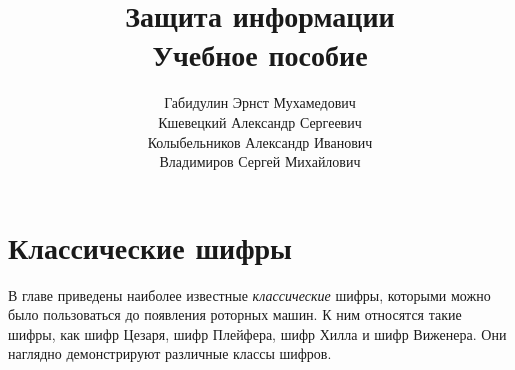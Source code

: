 

\title{Защита информации \\ Учебное пособие}
\author{Габидулин Эрнст Мухамедович \\ Кшевецкий Александр Сергеевич \\ Колыбельников Александр Иванович \\ Владимиров Сергей Михайлович}
\date{
}
\maketitle
\setcounter{page}{3}

\newpage
\setcounter{tocdepth}{2}
\tableofcontents
\newpage








\chapter{Классические шифры}

В главе приведены наиболее известные \emph{классические} шифры, которыми можно было пользоваться до появления роторных машин. К ним относятся такие шифры, как шифр Цезаря, шифр Плейфера, шифр Хилла и шифр Виженера. Они наглядно демонстрируют различные классы шифров.







%


